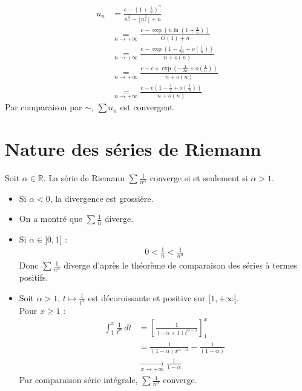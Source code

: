 \documentclass[../main.tex]{subfiles}
\begin{document}
\begin{align*}
    u_n &= \frac{e - \left( 1 + \frac{1}{n} \right)^n}{n^{\frac{3}{2}} - \lfloor n^{\frac{3}{2}} \rfloor + n} \\
    &\underset{n\to +\infty}{=} \frac{e - \exp \left( n \ln \left( 1 + \frac{1}{n} \right) \right)}{O(1) + n} \\
    &\underset{n\to +\infty}{=} \frac{e - \exp \left( 1 - \frac{1}{2n} + o \left( \frac{1}{n} \right) \right)}{n + o(n)} \\
    &\underset{n\to +\infty}{=} \frac{e - e \times \exp \left( -\frac{1}{2n} + o \left( \frac{1}{n} \right) \right)}{n + o(n)} \\
    &\underset{n\to +\infty}{=} \frac{e - e \left( 1 - \frac{1}{2} + o \left( \frac{1}{n} \right) \right)}{n + o(n)} 
\end{align*}
Par comparaison par $\sim$, $\sum u_n$ est convergent. 

\section{Nature des séries de Riemann}
\begin{tcolorbox}[title=Théorème 27.29, title filled=false, colframe=orange, colback=orange!10!white]
    Soit $\alpha\in \mathbb{R}$. La série de Riemann $\sum \frac{1}{n^{\alpha}}$ converge si et seulement si $\alpha > 1$. 
\end{tcolorbox}

\begin{itemize}
    \item Si $\alpha < 0$, la divergence est grossière. 
    \item On a montré que $\sum \frac{1}{n}$ diverge.
    \item Si $\alpha\in ]0, 1]$ : 
    \begin{align*}
        0 < \frac{1}{n} < \frac{1}{n^{\alpha}}
    \end{align*}
    Donc $\sum \frac{1}{n^{\alpha}}$ diverge d'après le théorème de comparaison des séries à termes positifs. 
    \item Soit $\alpha > 1$, $t\mapsto \frac{1}{t^{\alpha}}$ est décoroissante et positive sur $[1, +\infty[$. \\
    Pour $x\geq 1$ : 
    \begin{align*}
        \int_{1}^{x} \frac{1}{t^{\alpha}} \,dt &= \left[ \frac{1}{(-\alpha + 1)t^{\alpha - 1}} \right]_1^x \\
        &= \frac{1}{(1 - \alpha)x^{\alpha - 1}} - \frac{1}{(1 - \alpha)} \\
        &\underset{x\to +\infty}{\longrightarrow} \frac{1}{1 - \alpha}
    \end{align*}
    Par comparaison série intégrale, $\sum \frac{1}{n^{\alpha}}$ converge.
\end{itemize}
\end{document}
